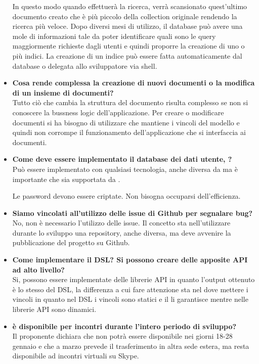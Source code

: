 \begin{itemize}
In questo modo quando effettuerà la ricerca, verrà scansionato quest'ultimo documento creato che è più piccolo della collection originale rendendo la ricerca più veloce.	 
Dopo diversi mesi di utilizzo, il database può avere una mole di informazioni tale da poter identificare quali sono le query
maggiormente richieste dagli utenti e quindi proporre la creazione di uno o più indici.
La creazione di un indice può essere fatta automaticamente dal database o delegata allo sviluppatore via shell.
		
		\item
		{\bfseries Cosa rende complessa la creazione di nuovi documenti o la modifica di un insieme di documenti?} \\
		Tutto ciò che cambia la struttura del documento risulta complesso se non si conoscere la bussness logic dell'applicazione.
		Per creare o modificare documenti si ha bisogno di utilizzare  che mantiene i vincoli del modello e quindi non corrompe il funzionamento dell'applicazione che si interfaccia ai documenti.
		
		\item
		{\bfseries Come deve essere implementato il database dei dati utente, ?} \\
		Può essere implementato con qualsiasi tecnologia, anche diversa da  ma è importante che sia supportata da .
		
		Le password devono essere criptate.
		Non bisogna occuparsi dell'efficienza.
		
		\item
		{\bfseries Siamo vincolati all'utilizzo delle issue di Github per segnalare bug?} \\
		No, non è necessario l'utilizzo delle issue. 
		Il concetto sta nell'utilizzare durante lo sviluppo una repository, anche diversa, ma deve avvenire la pubblicazione del
		progetto su Github.
		
		\item
		{\bfseries Come implementare il DSL? Si possono creare delle apposite API ad alto livello?} \\
		Si, possono essere implementate delle librerie API in quanto l'output ottenuto è lo stesso del DSL, la differenza a cui 	fare attenzione sta nel dove mettere i vincoli in quanto nel DSL i vincoli sono statici e il  li garantisce mentre nelle librerie API sono dinamici.
		
		\item
		{\bfseries \Proponente{} è disponibile per incontri durante l'intero periodo di sviluppo?} \\
		Il proponente dichiara che non potrà essere disponibile nei giorni 18-28 gennaio e che a marzo prevede il trasferimento in
		altra sede estera, ma resta disponibile ad incontri virtuali su Skype.
				
		
	\end{itemize}